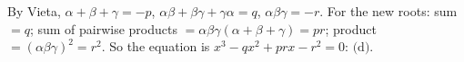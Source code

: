 By Vieta, $\alpha+\beta+\gamma=-p$, $\alpha\beta+\beta\gamma+\gamma\alpha=q$, $\alpha\beta\gamma=-r$. For the new roots: sum $=q$; sum of pairwise products $=\alpha\beta\gamma(\alpha+\beta+\gamma)=pr$; product $=(\alpha\beta\gamma)^2=r^2$. So the equation is $x^3-qx^2+prx-r^2=0$: $\boxed{\text{(d)}}$.
